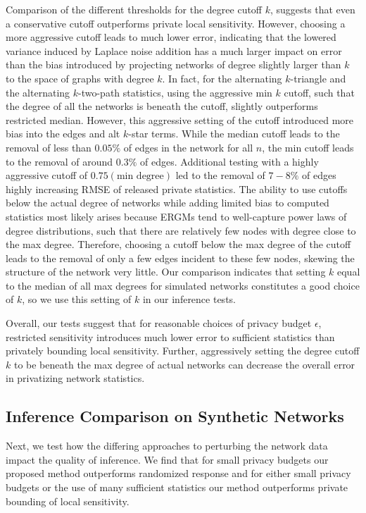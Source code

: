 Comparison of the different thresholds for the degree cutoff $k$, suggests that even a conservative cutoff outperforms private local sensitivity. However, choosing a more aggressive cutoff leads to much lower error, indicating that the lowered variance induced by Laplace noise addition has a much larger impact on error than the bias introduced by projecting networks of degree slightly larger than $k$ to the space of graphs with degree $k$. In fact, for the alternating $k$-triangle and the alternating $k$-two-path statistics, using the aggressive min $k$ cutoff, such that the degree of all the networks is beneath the cutoff, slightly outperforms restricted median. However, this aggressive setting of the cutoff introduced more bias into the edges and alt $k$-star terms. While the median cutoff leads to the removal of less than $0.05\%$ of edges in the network for all $n$, the min cutoff leads to the removal of around $0.3\%$ of edges. Additional testing with a highly aggressive cutoff of $0.75(\text{min degree})$ led to the removal of $7-8\%$ of edges highly increasing RMSE of released private statistics. The ability to use cutoffs below the actual degree of networks while adding limited bias to computed statistics most likely arises because ERGMs tend to well-capture power laws of degree distributions, such that there are relatively few nodes with degree close to the max degree. Therefore, choosing a cutoff below the max degree of the cutoff leads to the removal of only a few edges incident to these few nodes, skewing the structure of the network very little. Our comparison indicates that setting $k$ equal to the median of all max degrees for simulated networks constitutes a good choice of $k$, so we use this setting of $k$ in our inference tests. 

Overall, our tests suggest that for reasonable choices of privacy budget $\epsilon$, restricted sensitivity introduces much lower error to sufficient statistics than privately bounding local sensitivity. Further, aggressively setting the degree cutoff $k$ to be beneath the max degree of actual networks can decrease the overall error in privatizing network statistics. 

 \subsection{Inference Comparison on Synthetic Networks}
 
 Next, we test how the differing approaches to perturbing the network data impact the quality of inference. We find that for small privacy budgets our proposed method outperforms randomized response and for either small privacy budgets or the use of many sufficient statistics our method outperforms private bounding of local sensitivity. 
 
